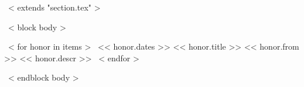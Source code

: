 ~< extends "section.tex" >~

~< block body >~
\begin{entrylistSeven}
~< for honor in items >~
\entrySeven
{<< honor.dates >>}
{<< honor.title >>}
{<< honor.from >>}
{<< honor.descr >>}
~< endfor >~
\end{entrylistSeven}
~< endblock body >~
